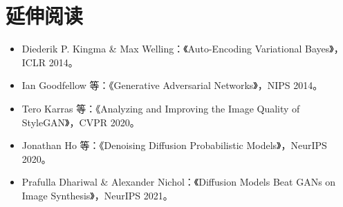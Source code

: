 \documentclass[UTF8,zihao=-4]{ctexart}
\begin{document}
\section*{延伸阅读}
\begin{itemize}
  \item Diederik P. Kingma \& Max Welling：《Auto-Encoding Variational Bayes》，ICLR 2014。
  \item Ian Goodfellow 等：《Generative Adversarial Networks》，NIPS 2014。
  \item Tero Karras 等：《Analyzing and Improving the Image Quality of StyleGAN》，CVPR 2020。
  \item Jonathan Ho 等：《Denoising Diffusion Probabilistic Models》，NeurIPS 2020。
  \item Prafulla Dhariwal \& Alexander Nichol：《Diffusion Models Beat GANs on Image Synthesis》，NeurIPS 2021。
\end{itemize}
\end{document}
